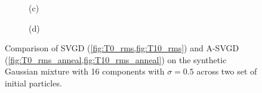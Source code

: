 \begin{figure}[t!]
\begin{subfigure}[b]{.48\textwidth}
    \caption{(c)\label{fig:T0_rms_anneal}}
\end{subfigure}
\hfill
\centering
\begin{subfigure}[b]{0.48\textwidth}
    \caption{(d)\label{fig:T10_rms_anneal}}
\end{subfigure}
\caption{Comparison of SVGD (\cref{fig:T0_rms,fig:T10_rms}) and A-SVGD (\cref{fig:T0_rms_anneal,fig:T10_rms_anneal}) on the synthetic Gaussian mixture with 16 components with $\sigma = 0.5$ across two set of initial particles. }
\label{fig:SVGD_ASVGD}
\end{figure}






